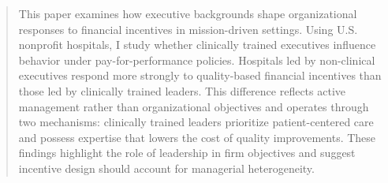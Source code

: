 \documentclass[12pt]{article}
\begin{document}
    \begin{abstract}
		{\small
    This paper examines how executive backgrounds shape organizational responses to financial incentives in mission-driven settings. Using U.S. nonprofit hospitals, I study whether clinically trained executives influence behavior under pay-for-performance policies. Hospitals led by non-clinical executives respond more strongly to quality-based financial incentives than those led by clinically trained leaders. This difference reflects active management rather than organizational objectives and operates through two mechanisms: clinically trained leaders prioritize patient-centered care and possess expertise that lowers the cost of quality improvements. These findings highlight the role of leadership in firm objectives and suggest incentive design should account for managerial heterogeneity.
        
        
}
\end{abstract}
\end{document}
